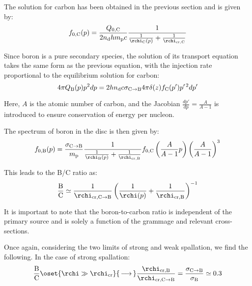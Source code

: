 The solution for carbon has been obtained in the previous section and is given by:
%
\begin{equation}
f_{0,\rm C}(p) = \frac{Q_{0,\rm C}}{2n_{\rm d}h m_{\rm p}c} \frac{1}{\frac{1}{\rchi_{\rm C}(p)} + \frac{1}{\rchi_{\rm cr, C}}}
\end{equation}

Since boron is a pure secondary species, the solution of its transport equation takes the same form as the previous equation, with the injection rate proportional to the equilibrium solution for carbon:
%
\begin{equation}
4 \pi Q_{\rm B}(p) p^2 dp = 2 h n_{\rm d} c \sigma_{\rm C \rightarrow B} 4 \pi \delta(z) f_{\rm C}(p^\prime) p^{\prime \, 2} dp^\prime
\end{equation}

Here, $A$ is the atomic number of carbon, and the Jacobian $\frac{dp'}{dp} = \frac{A}{A-1}$ is introduced to ensure conservation of energy per nucleon.

The spectrum of boron in the disc is then given by:
%
\begin{equation}
f_{0,\rm B}(p) 
= \frac{\sigma_{\rm C \rightarrow B}}{m_{\rm p}}  \frac{1}{\frac{1}{\rchi_{\rm B}(p)} + \frac{1}{\rchi_{\rm cr, B}}} f_{0, \rm C}\left(\frac{A}{A-1}p\right) \left(\frac{A}{A-1} \right)^3
\end{equation}

This leads to the B/C ratio as:
%
\begin{equation}
\frac{\rm B}{\rm C} \simeq \frac{1}{\rchi_{\rm cr, C\rightarrow B}} \left(\frac{1}{\rchi(p)} + \frac{1}{\rchi_{\rm cr, B}}\right)^{-1}
\label{eq:chibc}
\end{equation}

It is important to note that the boron-to-carbon ratio is independent of the primary source and is solely a function of the grammage and relevant cross-sections.

Once again, considering the two limits of strong and weak spallation, we find the following. 
%
In the case of strong spallation:
%
\begin{equation}
\frac{\rm B}{\rm C} \oset{\rchi \gg \rchi_{\rm cr}}{\, \longrightarrow \,} \frac{\rchi_{\rm cr, B}}{\rchi_{\rm cr, C\rightarrow B}} 
= \frac{\sigma_{\rm C \rightarrow B}}{\sigma_{\rm B}} 
\simeq 0.3
\end{equation}

